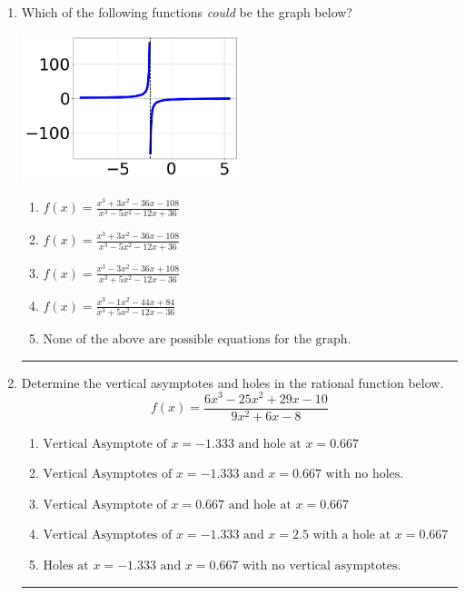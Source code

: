 \documentclass[14pt]{extbook}
\newcommand{\litem}[1]{\item#1\hspace*{-1cm}\rule{\textwidth}{0.4pt}}
\begin{document}
\begin{enumerate}
{\begin{enumerate}[label=\Alph*.]
\end{enumerate} }
\litem{
Which of the following functions \textit{could} be the graph below?
\begin{center}
    \includegraphics[width=0.5\textwidth]{../Figures/identifyGraphOfRationalFunctionA.png}
\end{center}
\begin{enumerate}[label=\Alph*.]
\item \( f(x)=\frac{x^{3} +3 x^{2} -36 x -108}{x^{3} -5 x^{2} -12 x + 36} \)
\item \( f(x)=\frac{x^{3} +3 x^{2} -36 x -108}{x^{3} -5 x^{2} -12 x + 36} \)
\item \( f(x)=\frac{x^{3} -3 x^{2} -36 x + 108}{x^{3} +5 x^{2} -12 x -36} \)
\item \( f(x)=\frac{x^{3} -1 x^{2} -44 x + 84}{x^{3} +5 x^{2} -12 x -36} \)
\item \( \text{None of the above are possible equations for the graph.} \)

\end{enumerate} }
\litem{
Determine the vertical asymptotes and holes in the rational function below.\[ f(x) = \frac{6x^{3} -25 x^{2} +29 x -10}{9x^{2} +6 x -8} \]\begin{enumerate}[label=\Alph*.]
\item \( \text{Vertical Asymptote of } x = -1.333 \text{ and hole at } x = 0.667 \)
\item \( \text{Vertical Asymptotes of } x = -1.333 \text{ and } x = 0.667 \text{ with no holes.} \)
\item \( \text{Vertical Asymptote of } x = 0.667 \text{ and hole at } x = 0.667 \)
\item \( \text{Vertical Asymptotes of } x = -1.333 \text{ and } x = 2.5 \text{ with a hole at } x = 0.667 \)
\item \( \text{Holes at } x = -1.333 \text{ and } x = 0.667 \text{ with no vertical asymptotes.} \)


\end{enumerate}}
\end{enumerate}
\end{document}

